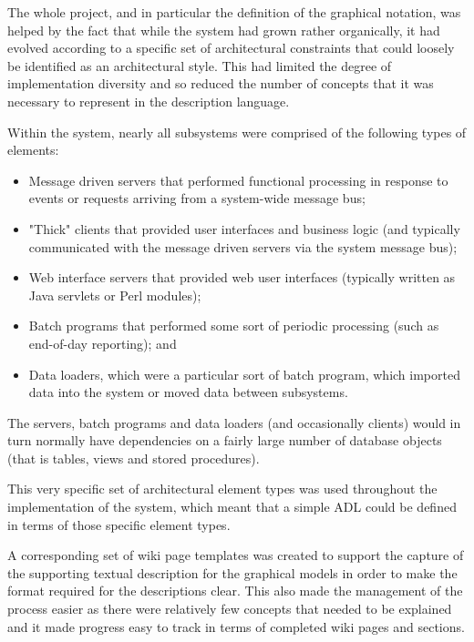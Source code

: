   The whole project, and in particular the definition of the graphical notation, was helped by the fact that while the system had grown rather organically, it had evolved according to a specific set of architectural constraints that could loosely be identified as an architectural style.  This had limited the degree of implementation diversity and so reduced the number of concepts that it was necessary to represent in the description language.

  Within the system, nearly all subsystems were comprised of the following types of elements:

  \begin{itemize}

\item Message driven servers that performed functional processing in response to events or requests arriving from a system-wide message bus;

\item "Thick" clients that provided user interfaces and business logic (and typically communicated with the message driven servers via the system message bus);

\item Web interface servers that provided web user interfaces (typically written as Java servlets or Perl modules);

\item Batch programs that performed some sort of periodic processing (such as end-of-day reporting); and 

\item Data loaders, which were a particular sort of batch program, which imported data into the system or moved data between subsystems.

\end{itemize}

  The servers, batch programs and data loaders (and occasionally clients) would in turn normally have dependencies on a fairly large number of database objects (that is tables, views and stored procedures).

  This very specific set of architectural element types was used throughout the implementation of the system, which meant that a simple ADL could be defined in terms of those specific element types.

  A corresponding set of wiki page templates was created to support the capture of the supporting textual description for the graphical models in order to make the format required for the descriptions clear. This also made the management of the process easier as there were relatively few concepts that needed to be explained and it made progress easy to track in terms of completed wiki pages and sections.

